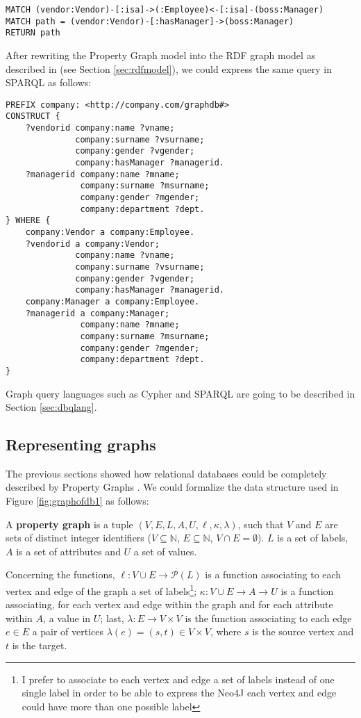 \begin{lstlisting}[language=Cypher]
MATCH (vendor:Vendor)-[:isa]->(:Employee)<-[:isa]-(boss:Manager)
MATCH path = (vendor:Vendor)-[:hasManager]->(boss:Manager)
RETURN path
\end{lstlisting}

After rewriting the Property Graph model into the RDF graph model as described in \cite{DasSPCB14} (see Section \vref{sec:rdfmodel}), we could express the same query in SPARQL as follows:

\begin{lstlisting}[language=SPARQL,mathescape=true]
PREFIX company: <http://company.com/graphdb#>
CONSTRUCT { 
	?vendorid company:name ?vname;
	          company:surname ?vsurname;
	          company:gender ?vgender;
	          company:hasManager ?managerid.
	?managerid company:name ?mname;
	           company:surname ?msurname;
	           company:gender ?mgender;
	           company:department ?dept.
} WHERE {
    company:Vendor a company:Employee.
    ?vendorid a company:Vendor;
	          company:name ?vname;
	          company:surname ?vsurname;
	          company:gender ?vgender;
	          company:hasManager ?managerid.
    company:Manager a company:Employee.
    ?managerid a company:Manager;
	           company:name ?mname;
	           company:surname ?msurname;
	           company:gender ?mgender;
	           company:department ?dept.
}
\end{lstlisting}

Graph query languages such as Cypher and SPARQL are going to be described in Section \vref{sec:dbqlang}.

\subsection{Representing graphs}
The previous sections showed how relational databases could be completely described by Property Graphs \cite{Neo4jAlg}.  We could formalize the data structure used in Figure \ref{fig:graphofdb1} as follows:

\begin{definition}\label{def:propg10}
A \textbf{property graph} is a tuple $(V,E,L,A,U,\ell,\kappa,\lambda)$, such that $V$ and $E$ are sets of distinct integer identifiers ($V\subseteq \mathbb{N}$, $E\subseteq \mathbb{N}$, $V\cap E=\emptyset$). $L$ is a set of labels, $A$ is a set of attributes and $U$ a set of values.

Concerning the functions, $\ell\colon V\cup E\to \mathcal{P}(L)$ is a function associating to each vertex and edge of the graph a set of labels\footnote{I prefer to associate to each vertex and edge a set of labels instead of one single label in order to be able to express the Neo4J \cite{Neo4jMan,Neo4jAlg} each vertex and edge could have more than one possible label}; $\kappa\colon V\cup E\to A\to U$   is a function associating, for each vertex and edge within the graph and for each attribute within $A$, a value in $U$; last, $\lambda\colon E\to V\times V$ is the function associating to each edge $e\in E$ a pair of vertices $\lambda(e)=(s,t)\in V\times V$, where $s$ is the source vertex and $t$ is the target. 
\end{definition}

